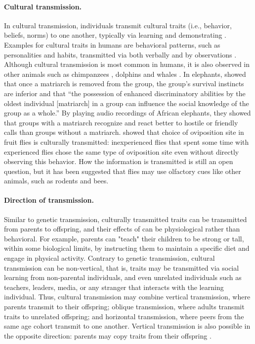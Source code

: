 \documentclass[12pt]{extarticle}
\begin{document}
\paragraph{Cultural transmission.}
In cultural transmission, individuals transmit cultural traits (i.e., behavior, beliefs, norms) to one another, typically via learning and demonstrating \citep{transmissionVectorsBook}.
Examples for cultural traits in humans are behavioral patterns, such as personalities and habits, transmitted via both verbally and by observations \citep{cultural_traits}. 
Although cultural transmission is most common in humans, it is also observed in other animals such as chimpanzees \citep{chimpsPrestige, chimpsCopy}, dolphins and whales \citep{dolphins_whales}.
In elephants, \citet{elepahntsRepo} showed that once a matriarch is removed from the group, the group's survival instincts are inferior and that ``the possession of enhanced discriminatory abilities by the oldest individual [matriarch] in a group can influence the social knowledge of the group as a whole.''
By playing audio recordings of African elephants, they showed that groups with a matriarch recognize and react better to hostile or friendly calls than groups without a matriarch.
\citet{fliesPaper} showed that choice of oviposition site in fruit flies is culturally transmitted: inexperienced flies that spent some time with experienced flies chose the same type of oviposition site even without directly observing this behavior. How the information is transmitted is still an open question, but it has been suggested that flies may use olfactory cues like other animals, such as rodents and bees.

\paragraph{Direction of transmission.}
Similar to genetic transmission, culturally transmitted traits can be transmitted from parents to offspring, and their effects of can be physiological rather than behavioral.
For example, parents can "teach" their children to be strong or tall, within some biological limits, by instructing them to maintain a specific diet and engage in physical activity.
Contrary to genetic transmission, cultural transmission can be non-vertical, that is, traits may be transmitted via social learning from non-parental individuals, and even unrelated individuals such as teachers, leaders, media, or any stranger that interacts with the learning individual.
Thus, cultural transmission may combine vertical transmission, where parents transmit to their offspring; oblique transmission, where adults transmit traits to unrelated offspring; and horizontal transmission, where peers from the same age cohort transmit to one another. 
Vertical transmission is also possible in the opposite direction: parents may copy traits from their offspring \citep{transmissionVectorsBook,transmissionVectors}.
\end{document}
